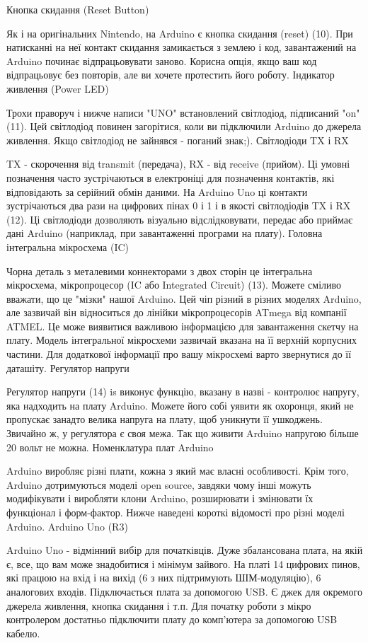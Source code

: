 \documentclass[12pt,a4paper]{report}  %
\begin{document}
Кнопка скидання (Reset Button)

Як і на оригінальних Nintendo, на Arduino є кнопка скидання (reset) (10). При натисканні на неї контакт скидання замикається з землею і код, завантажений на Arduino починає відпрацьовувати заново. Корисна опція, якщо ваш код відпрацьовує без повторів, але ви хочете протестить його роботу.
Індикатор живлення (Power LED)

Трохи праворуч і нижче написи "UNO" встановлений світлодіод, підписаний "on" (11). Цей світлодіод повинен загорітися, коли ви підключили Arduino до джерела живлення. Якщо світлодіод не зайнявся - поганий знак;).
Світлодіоди TX і RX

TX - скорочення від transmit (передача), RX - від receive (прийом). Ці умовні позначення часто зустрічаються в електроніці для позначення контактів, які відповідають за серійний обмін даними. На Arduino Uno ці контакти зустрічаються два рази на цифрових пінах 0 і 1 і в якості світлодіодів TX і RX (12). Ці світлодіоди дозволяють візуально відслідковувати, передає або приймає дані Arduino (наприклад, при завантаженні програми на плату).
Головна інтегральна мікросхема (IC)

Чорна деталь з металевими коннекторами з двох сторін це інтегральна мікросхема, мікропроцесор (IC або Integrated Circuit) (13). Можете сміливо вважати, що це "мізки" нашої Arduino. Цей чіп різний в різних моделях Arduino, але зазвичай він відноситься до лінійки мікропроцесорів ATmega від компанії ATMEL. Це може виявитися важливою інформацією для завантаження скетчу на плату. Модель інтегральної мікросхеми зазвичай вказана на її верхній корпусних частини. Для додаткової інформації про вашу мікросхемі варто звернутися до її даташіту.
Регулятор напруги

Регулятор напруги (14) is виконує функцію, вказану в назві - контролює напругу, яка надходить на плату Arduino. Можете його собі уявити як охоронця, який не пропускає занадто велика напруга на плату, щоб уникнути її ушкоджень. Звичайно ж, у регулятора є своя межа. Так що живити Arduino напругою більше 20 вольт не можна.
Номенклатура плат Arduino

Arduino виробляє різні плати, кожна з який має власні особливості. Крім того, Arduino дотримуються моделі open source, завдяки чому інші можуть модифікувати і виробляти клони Arduino, розширювати і змінювати їх функціонал і форм-фактор. Нижче наведені короткі відомості про різні моделі Arduino.
Arduino Uno (R3)

Arduino Uno - відмінний вибір для початківців. Дуже збалансована плата, на якій є, все, що вам може знадобитися і мінімум зайвого. На платі 14 цифрових пинов, які працюю на вхід і на вихід (6 з них підтримують ШІМ-модуляцію), 6 аналогових входів. Підключається плата за допомогою USB. Є джек для окремого джерела живлення, кнопка скидання і т.п. Для початку роботи з мікро контролером достатньо підключити плату до комп'ютера за допомогою USB кабелю.
\end{document}
